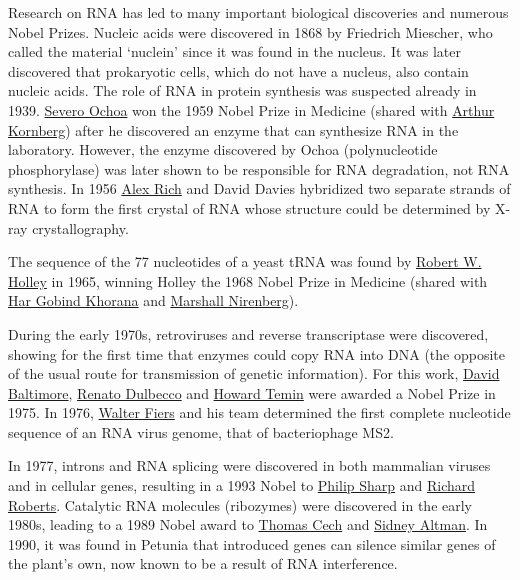 Research on RNA has led to many important biological discoveries and numerous Nobel Prizes. Nucleic acids were discovered in 1868 by Friedrich Miescher, who called the material `nuclein' since it was found in the nucleus. It was later discovered that prokaryotic cells, which do not have a nucleus, also contain nucleic acids. The role of RNA in protein synthesis was suspected already in 1939. \href{}{Severo Ochoa} won the 1959 Nobel Prize in Medicine (shared with \href{}{Arthur Kornberg}) after he discovered an enzyme that can synthesize RNA in the laboratory. However, the enzyme discovered by Ochoa (polynucleotide phosphorylase) was later shown to be responsible for RNA degradation, not RNA synthesis. In 1956 \href{https://en.wikipedia.org/wiki/Alexander_Rich}{Alex Rich} and David Davies hybridized two separate strands of RNA to form the first crystal of RNA whose structure could be determined by X-ray crystallography.

The sequence of the 77 nucleotides of a yeast tRNA was found by \href{https://en.wikipedia.org/wiki/Robert_W._Holley}{Robert W. Holley} in 1965, winning Holley the 1968 Nobel Prize in Medicine (shared with \href{https://en.wikipedia.org/wiki/Har_Gobind_Khorana}{Har Gobind Khorana} and \href{https://en.wikipedia.org/wiki/Marshall_Warren_Nirenberg}{Marshall Nirenberg}).

During the early 1970s, retroviruses and reverse transcriptase were discovered, showing for the first time that enzymes could copy RNA into DNA (the opposite of the usual route for transmission of genetic information). For this work, \href{https://en.wikipedia.org/wiki/David_Baltimore}{David Baltimore}, \href{https://en.wikipedia.org/wiki/Renato_Dulbecco}{Renato Dulbecco} and \href{https://en.wikipedia.org/wiki/Howard_Martin_Temin}{Howard Temin} were awarded a Nobel Prize in 1975. In 1976, \href{}{Walter Fiers} and his team determined the first complete nucleotide sequence of an RNA virus genome, that of bacteriophage MS2.

In 1977, introns and RNA splicing were discovered in both mammalian viruses and in cellular genes, resulting in a 1993 Nobel to \href{https://en.wikipedia.org/wiki/Phillip_Allen_Sharp}{Philip Sharp} and \href{https://en.wikipedia.org/wiki/Richard_J._Roberts}{Richard Roberts}. Catalytic RNA molecules (ribozymes) were discovered in the early 1980s, leading to a 1989 Nobel award to \href{https://en.wikipedia.org/wiki/Thomas_Cech}{Thomas Cech} and \href{https://en.wikipedia.org/wiki/Sidney_Altman}{Sidney Altman}. In 1990, it was found in Petunia that introduced genes can silence similar genes of the plant's own, now known to be a result of RNA interference.

